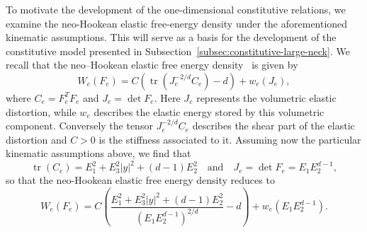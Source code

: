 \documentclass[a4paper,10pt,oneside]{amsbook}
\numberwithin{section}{chapter}
\numberwithin{equation}{chapter}
\theoremstyle{definition}
\DeclareMathOperator{\tr}{tr}
\begin{document}

To motivate the development of the one-dimensional constitutive relations, we examine the neo-Hookean elastic free-energy density under the aforementioned kinematic assumptions. This will serve as a basis for the development of the constitutive model presented in Subsection~\ref{subsec:constitutive-large-neck}. We recall that the neo--Hookean elastic free energy density~\cite{rivlin1948large} is given by
\[
W_e(F_e)=C\left(\tr(J_e^{-2/d}C_e)-d\right)+w_e(J_e),
\]
where $C_e=F_e^TF_e$ and $J_e=\det F_e$. Here $J_e$ represents the volumetric elastic distortion, while $w_e$ describes the elastic energy stored by this volumetric component. Conversely the tensor $J_e^{-2/d}C_e$ describes the shear part of the elastic distortion and $C>0$ is the stiffness associated to it. Assuming now the particular kinematic assumptions above, we find that
\[
\tr(C_e)=E_1^2+E_3^2|y|^2+(d-1)E_2^2\quad\text{and}\quad J_e=\det F_e=E_1E_2^{d-1},
\]
so that the neo-Hookean elastic free energy density reduces to
\begin{equation}
\label{eqn:necking-large:neo-hookean}
W_e(F_e)=C\left(\frac{E_1^2+E_3^2|y|^2+(d-1)E_2^2}{(E_1E_2^{d-1})^{2/d}}-d\right)+w_e(E_1E_2^{d-1}).
\end{equation}
\end{document}
